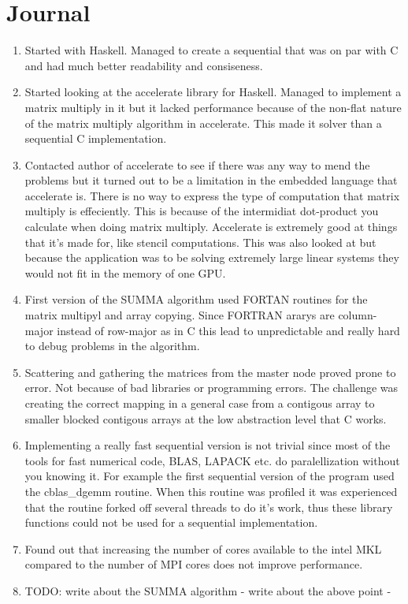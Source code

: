 \documentclass{article}
\begin{document}
\section{Journal}
\begin{enumerate}
	\item Started with Haskell. Managed to create a sequential that was on par with C and had much better readability and consiseness.
	\item Started looking at the accelerate library for Haskell. Managed to implement a matrix multiply in it but it lacked performance because of the non-flat nature of the matrix multiply algorithm in accelerate. This made it solver than a sequential C implementation.
	\item Contacted author of accelerate to see if there was any way to mend the problems but it turned out to be a limitation in the embedded language that accelerate is. There is no way to express the type of computation that matrix multiply is effeciently. This is because of the intermidiat dot-product you calculate when doing matrix multiply. Accelerate is extremely good at things that it's made for, like stencil computations. This was also looked at but because the application was to be solving extremely large linear systems they would not fit in the memory of one GPU.
	\item First version of the SUMMA algorithm used FORTAN routines for the matrix multipyl and array copying. Since FORTRAN ararys are column-major instead of row-major as in C this lead to unpredictable and really hard to debug problems in the algorithm.
	\item Scattering and gathering the matrices from the master node proved prone to error. Not because of bad libraries or programming errors. The challenge was creating the correct mapping in a general case from a contigous array to smaller blocked contigous arrays at the low abstraction level that C works.
	\item Implementing a really fast sequential version is not trivial since most of the tools for fast numerical code, BLAS, LAPACK etc. do paralellization without you knowing it. For example the first sequential version of the program used the cblas\_dgemm routine. When this routine was profiled it was experienced that the routine forked off several threads to do it's work, thus these library functions could not be used for a sequential implementation.
	\item Found out that increasing the number of cores available to the intel MKL compared to the number of MPI cores does not improve performance.
	\item TODO: write about the SUMMA algorithm - write about the above point -
\end{enumerate}
\end{document}
